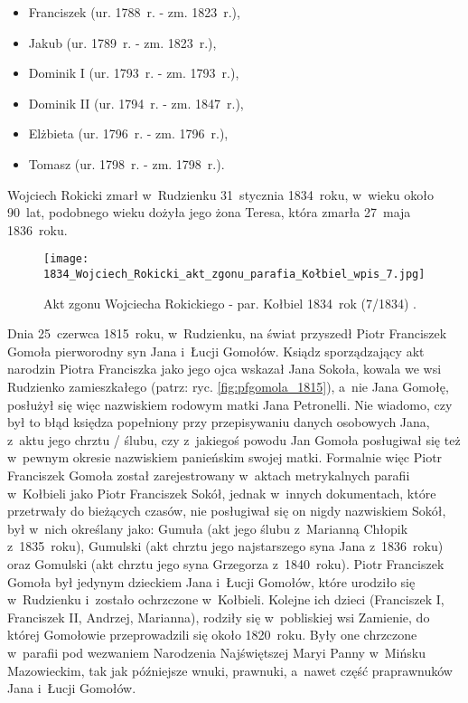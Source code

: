 \begin{itemize}
    \item Franciszek (ur. 1788~r. - zm. 1823~r.),
    \item Jakub (ur. 1789~r.  - zm. 1823~r.),
    \item Dominik I (ur. 1793~r. - zm. 1793~r.),
    \item Dominik II (ur. 1794~r. - zm. 1847~r.),
    \item Elżbieta (ur. 1796~r. - zm. 1796~r.),
    \item Tomasz (ur. 1798~r. - zm. 1798~r.).
  \end{itemize}

Wojciech Rokicki zmarł w~Rudzienku 31~stycznia 1834~roku, w~wieku około 
90~lat, podobnego wieku dożyła jego żona Teresa, która zmarła 27~maja 
1836~roku.

\begin{figure}[!ht]
    \vspace*{0.5cm}
    \centering \texttt{[image: 
        1834\_Wojciech\_Rokicki\_akt\_zgonu\_parafia\_Kołbiel\_wpis\_7.jpg]}
    \captionsetup{format=hang}
    \caption{Akt zgonu Wojciecha Rokickiego - par. Kołbiel 1834~rok (7/1834) 
    \cite{par_kolbiel1}.}
    \label{fig:wrokicki_1834}
\end{figure}

Dnia 25~czerwca 1815~roku, w~Rudzienku, na świat przyszedł Piotr Franciszek 
Gomoła pierworodny syn Jana i~Łucji Gomołów. Ksiądz sporządzający akt narodzin 
Piotra Franciszka jako jego ojca wskazał Jana Sokoła, kowala we wsi Rudzienko 
zamieszkałego (patrz: ryc. \ref{fig:pfgomola_1815}), a~nie Jana Gomołę, 
posłużył się więc nazwiskiem rodowym matki Jana Petronelli. Nie wiadomo, czy 
był to błąd księdza popełniony przy przepisywaniu danych osobowych Jana, 
z~aktu jego chrztu / ślubu, czy z~jakiegoś powodu Jan Gomoła posługiwał się 
też w~pewnym okresie nazwiskiem panieńskim swojej matki. Formalnie więc Piotr 
Franciszek Gomoła został zarejestrowany w~aktach metrykalnych parafii 
w~Kołbieli jako Piotr Franciszek Sokół, jednak w~innych dokumentach, które 
przetrwały do bieżących czasów, nie posługiwał się on nigdy nazwiskiem Sokół, 
był w~nich określany jako: Gumuła (akt jego ślubu z~Marianną Chłopik 
z~1835~roku), Gumulski (akt chrztu jego najstarszego syna Jana z~1836~roku) 
oraz Gomulski (akt chrztu jego syna Grzegorza z~1840~roku). Piotr Franciszek 
Gomoła był jedynym dzieckiem Jana i~Łucji Gomołów, które urodziło się 
w~Rudzienku i~zostało ochrzczone w~Kołbieli. Kolejne ich dzieci (Franciszek 
I, Franciszek II, Andrzej, Marianna), rodziły się w~pobliskiej wsi Zamienie, 
do której Gomołowie przeprowadzili się około 1820~roku. Były one chrzczone 
w~parafii pod wezwaniem Narodzenia Najświętszej Maryi Panny w~Mińsku 
Mazowieckim, tak jak późniejsze wnuki, prawnuki, a~nawet część praprawnuków 
Jana i~Łucji Gomołów.


